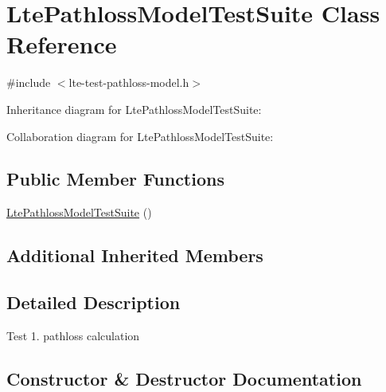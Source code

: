 \hypertarget{classLtePathlossModelTestSuite}{}\section{Lte\+Pathloss\+Model\+Test\+Suite Class Reference}
\label{classLtePathlossModelTestSuite}


{\ttfamily \#include $<$lte-\/test-\/pathloss-\/model.\+h$>$}



Inheritance diagram for Lte\+Pathloss\+Model\+Test\+Suite\+:


Collaboration diagram for Lte\+Pathloss\+Model\+Test\+Suite\+:
\subsection*{Public Member Functions}
\begin{DoxyCompactItemize}
\item 
\hyperlink{classLtePathlossModelTestSuite_a9e3cff73eb0207a52f5578013f90a7e5}{Lte\+Pathloss\+Model\+Test\+Suite} ()
\end{DoxyCompactItemize}
\subsection*{Additional Inherited Members}


\subsection{Detailed Description}
Test 1. pathloss calculation 

\subsection{Constructor \& Destructor Documentation}
